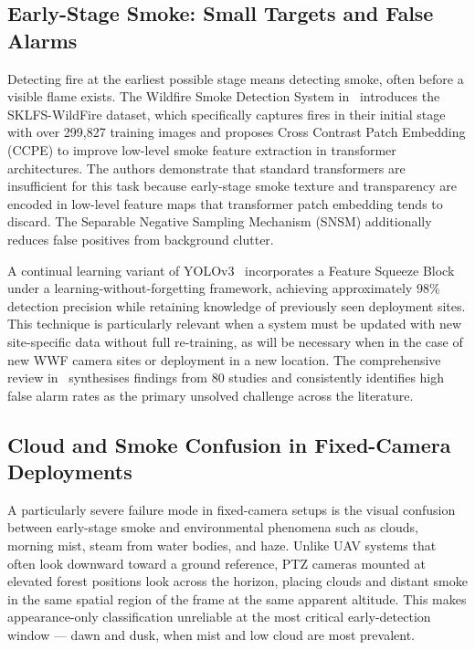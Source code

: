 \documentclass[11pt,twocolumn]{article}
\begin{document}
\subsection{Early-Stage Smoke: Small Targets and False Alarms}

Detecting fire at the earliest possible stage means detecting smoke,
often before a visible flame exists. The Wildfire Smoke Detection
System in~\cite{wildfire2023} introduces the SKLFS-WildFire dataset,
which specifically captures fires in their initial stage with over
299,827 training images and proposes Cross Contrast Patch Embedding
(CCPE) to improve low-level smoke feature extraction in transformer
architectures. The authors demonstrate that standard transformers are
insufficient for this task because early-stage smoke texture and
transparency are encoded in low-level feature maps that transformer
patch embedding tends to discard. The Separable Negative Sampling
Mechanism (SNSM) additionally reduces false positives from background
clutter.

A continual learning variant of YOLOv3~\cite{fireecology2023}
incorporates a Feature Squeeze Block under a learning-without-forgetting
framework, achieving approximately 98\% detection precision while
retaining knowledge of previously seen deployment sites. This technique
is particularly relevant when a system must be updated with new
site-specific data without full re-training, as will be necessary when
in the case of new WWF camera sites or deployment in a new location. The comprehensive review
in~\cite{comprehensive2025} synthesises findings from 80 studies and
consistently identifies high false alarm rates as the primary unsolved
challenge across the literature.

\subsection{Cloud and Smoke Confusion in Fixed-Camera Deployments}

A particularly severe failure mode in fixed-camera setups is the
visual confusion between early-stage smoke and environmental phenomena
such as clouds, morning mist, steam from water bodies, and haze.
Unlike UAV systems that often look downward toward a ground reference,
PTZ cameras mounted at elevated forest positions look across the horizon,
placing clouds and distant smoke in the same spatial region of the frame
at the same apparent altitude. This makes appearance-only classification
unreliable at the most critical early-detection window --- dawn and dusk,
when mist and low cloud are most prevalent.
\end{document}
